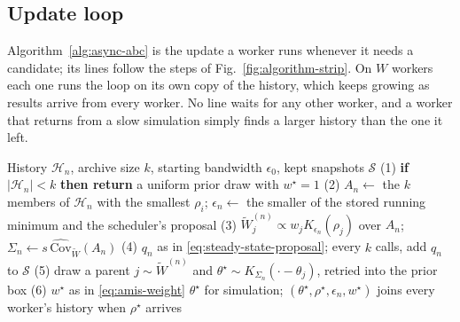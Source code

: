 \documentclass[10pt]{article}
\theoremstyle{plain}
\theoremstyle{definition}
\begin{document}
\subsection{Update loop}\label{sec:method-algorithm}
Algorithm~\ref{alg:async-abc} is the update a worker runs whenever it needs a candidate; its lines follow the steps of Fig.~\ref{fig:algorithm-strip}. On $W$ workers each one runs the loop on its own copy of the history, which keeps growing as results arrive from every worker. No line waits for any other worker, and a worker that returns from a slow simulation simply finds a larger history than the one it left.
\begin{algorithm}
\caption{One update of the generation-free sampler, run by a worker on its copy of the history}\label{alg:async-abc}
\begin{algorithmic}
\Require History $\mathcal{H}_n$, archive size $k$, starting bandwidth $\epsilon_0$, kept snapshots $\mathcal{S}$
\State (1) \textbf{if} $|\mathcal{H}_n|<k$ \textbf{then return} a uniform prior draw with $w^\star=1$ 
\State (2) $A_n\gets$ the $k$ members of $\mathcal{H}_n$ with the smallest $\rho_i$; $\epsilon_n\gets$ the smaller of the stored running minimum and the scheduler's proposal
\State (3) $\tilde W^{(n)}_j\propto w_jK_{\epsilon_n}(\rho_j)$ over $A_n$; $\Sigma_n\gets s\,\widehat{\mathrm{Cov}}_{\tilde W}(A_n)$
\State (4) $q_n$ as in \eqref{eq:steady-state-proposal}; every $k$ calls, add $q_n$ to $\mathcal{S}$
\State (5) draw a parent $j\sim\tilde W^{(n)}$ and $\theta^\star\sim K_{\Sigma_n}(\cdot-\theta_j)$, retried into the prior box
\State (6) $w^\star$ as in \eqref{eq:amis-weight}
\State \Return $\theta^\star$ for simulation; $(\theta^\star,\rho^\star,\epsilon_n,w^\star)$ joins every worker's history when $\rho^\star$ arrives
\end{algorithmic}
\end{algorithm}
\end{document}
